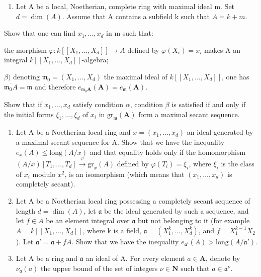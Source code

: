 \begin{enumerate}
\def\labelenumi{\arabic{enumi})}
\setcounter{enumi}{14}
\tightlist
\item
  Let A be a local, Noetherian, complete ring with maximal ideal m. Set \(d = \dim(A)\). Assume that A contains a subfield k such that \(A = k + m\).
\end{enumerate}

Show that one can find \(x_{1},\ldots,x_{d}\) in m such that:

the morphism \(\varphi:k[[X_{1},...,X_{d}]]\to A\) defined by \(\varphi(X_{i})=x_{i}\) makes A an integral \(k[[X_{1},...,X_{d}]]\)-algebra;

\(\beta)\) denoting \(\mathfrak{m}_0 = (X_1, \ldots, X_d)\) the maximal ideal of \(k[[X_1, \ldots, X_d]]\), one has \(\overline{\mathfrak{m}_0A} = \mathfrak{m}\) and therefore \(e_{\mathfrak{m}_0\mathbf{A}}(\mathbf{A}) = e_{\mathfrak{m}}(\mathbf{A})\).

Show that if \(x_{1},\ldots,x_{d}\) satisfy condition \(\alpha\), condition \(\beta\) is satisfied if and only if the initial forms \(\xi_{1},\ldots,\xi_{d}\) of \(x_{i}\) in \(\mathrm{gr}_{\mathfrak{m}}(\mathbf{A})\) form a maximal secant sequence.

\begin{enumerate}
\def\labelenumi{\arabic{enumi})}
\setcounter{enumi}{15}
\item
  Let A be a Noetherian local ring and \(x = (x_1, \ldots, x_d)\) an ideal generated by a maximal secant sequence for A. Show that we have the inequality \(e_x(A) \leqslant \text{long}(A/x)\) and that equality holds only if the homomorphism \((A/x)[T_1, \ldots, T_d] \xrightarrow{\varphi} \text{gr}_x(A)\) defined by \(\varphi(T_i) = \xi_i\), where \(\xi_i\) is the class of \(x_i\) modulo \(x^2\), is an isomorphism (which means that \((x_1, \ldots, x_d)\) is completely secant).
\item
  Let A be a Noetherian local ring possessing a completely secant sequence of length \(d = \dim(A)\), let \(\mathfrak{a}\) be the ideal generated by such a sequence, and let \(f \in A\) be an element integral over \(\mathfrak{a}\) but not belonging to it (for example \(A = k[[X_1, ..., X_d]]\), where k is a field, \(\mathfrak{a} = (X_1^k, ..., X_d^k)\), and \(f = X_1^{k-1}X_2\)). Let \(\mathfrak{a}' = \mathfrak{a} + fA\). Show that we have the inequality \(e_{\mathfrak{a}'}(A) > \text{long}(A/\mathfrak{a}')\).
\item
  Let A be a ring and \(\mathfrak{a}\) an ideal of A. For every element \(a \in \mathbf{A}\), denote by \(\nu_{\mathfrak{a}}(a)\) the upper bound of the set of integers \(\nu \in \mathbf{N}\) such that \(a \in \mathfrak{a}^{\nu}\).
\end{enumerate}

